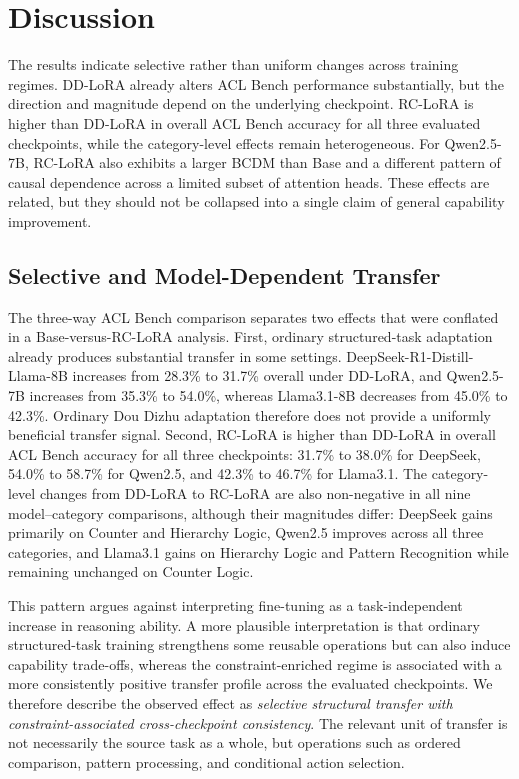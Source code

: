 \section{Discussion}
\label{sec:discussion}

The results indicate selective rather than uniform changes across training regimes. DD-LoRA already alters ACL Bench performance substantially, but the direction and magnitude depend on the underlying checkpoint. RC-LoRA is higher than DD-LoRA in overall ACL Bench accuracy for all three evaluated checkpoints, while the category-level effects remain heterogeneous. For Qwen2.5-7B, RC-LoRA also exhibits a larger BCDM than Base and a different pattern of causal dependence across a limited subset of attention heads. These effects are related, but they should not be collapsed into a single claim of general capability improvement.

\subsection{Selective and Model-Dependent Transfer}
\label{sec:discussion_transfer}

The three-way ACL Bench comparison separates two effects that were conflated in a Base-versus-RC-LoRA analysis. First, ordinary structured-task adaptation already produces substantial transfer in some settings. DeepSeek-R1-Distill-Llama-8B increases from 28.3\% to 31.7\% overall under DD-LoRA, and Qwen2.5-7B increases from 35.3\% to 54.0\%, whereas Llama3.1-8B decreases from 45.0\% to 42.3\%. Ordinary Dou Dizhu adaptation therefore does not provide a uniformly beneficial transfer signal. Second, RC-LoRA is higher than DD-LoRA in overall ACL Bench accuracy for all three checkpoints: 31.7\% to 38.0\% for DeepSeek, 54.0\% to 58.7\% for Qwen2.5, and 42.3\% to 46.7\% for Llama3.1. The category-level changes from DD-LoRA to RC-LoRA are also non-negative in all nine model--category comparisons, although their magnitudes differ: DeepSeek gains primarily on Counter and Hierarchy Logic, Qwen2.5 improves across all three categories, and Llama3.1 gains on Hierarchy Logic and Pattern Recognition while remaining unchanged on Counter Logic.

This pattern argues against interpreting fine-tuning as a task-independent increase in reasoning ability. A more plausible interpretation is that ordinary structured-task training strengthens some reusable operations but can also induce capability trade-offs, whereas the constraint-enriched regime is associated with a more consistently positive transfer profile across the evaluated checkpoints. We therefore describe the observed effect as \emph{selective structural transfer with constraint-associated cross-checkpoint consistency}. The relevant unit of transfer is not necessarily the source task as a whole, but operations such as ordered comparison, pattern processing, and conditional action selection.

